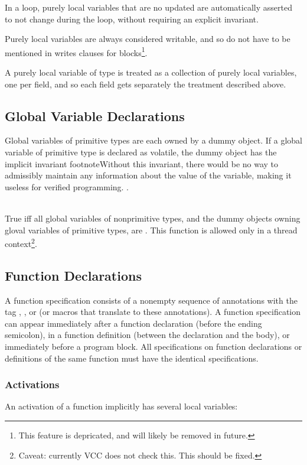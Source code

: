 \documentclass[preprint,nocopyrightspace]{sigplanconf}
\begin{document}
{{{{\begin{VCC}
In a loop, purely local variables that are no updated are
automatically asserted to not change during the loop, without
requiring an explicit invariant.

Purely local variables are always considered writable, and so do not
have to be mentioned in writes clauses for blocks\footnote{This
feature is depricated, and will likely be removed in future.}. 


A purely local variable of  type is treated
as a collection of purely local variables, one per field, and so each
field gets separately the treatment described above.

\subsection{Global Variable Declarations}
Global variables of primitive types are each owned by a dummy
object. If a global variable  of primitive type is declared as
volatile, the dummy object has the implicit invariant
footnote{Without this invariant, there would be no way to admissibly
maintain any information about the value of the variable, making it
useless for verified programming.
}.

\\
True iff all global variables of nonprimitive types, and the dummy
objects owning gloval variables of primitive types,
are \vcc{\mutable}. This function is allowed only in a thread
context\footnote{
Caveat: currently VCC does not check this. This should be fixed.
}.


\subsection{Function Declarations}
A function specification consists of a nonempty sequence of
annotations with the tag , ,
or  (or macros that translate to these annotations). A
function specification can appear immediately after a function
declaration (before the ending semicolon), in a function definition
(between the declaration and the body), or immediately before a
program block. All specifications on function declarations or
definitions of the same function must have the identical
specifications.

\subsubsection{Activations}
An activation of a function implicitly has several local variables: 


\end{VCC}}}}}
\end{document}
